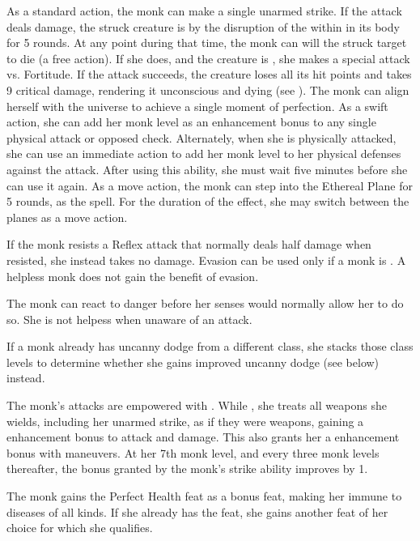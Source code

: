  As a standard action, the monk can make a single unarmed strike. If the attack deals damage, the struck creature is \sickened by the disruption of the \ki within in its body for 5 rounds. At any point during that time, the monk can will the struck target to die (a free action). If she does, and the creature is \bloodied, she makes a special attack vs. Fortitude. If the attack succeeds, the creature loses all its hit points and takes 9 critical damage, rendering it unconscious and dying (see ).
 The monk can align herself with the universe to achieve a single moment of perfection. As a swift action, she can add her monk level as an enhancement bonus to any single physical attack or opposed check. Alternately, when she is physically attacked, she can use an immediate action to add her monk level to her physical defenses against the attack. After using this ability, she must wait five minutes before she can use it again.
 As a move action, the monk can step into the Ethereal Plane for 5 rounds, as the  spell. For the duration of the effect, she may switch between the planes as a move action.

 If the monk resists a Reflex attack that normally deals half damage when resisted, she instead takes no damage. Evasion can be used only if a monk is \unencumbered. A helpless monk does not gain the benefit of evasion.

 The monk can react to danger before her senses would normally allow her to do so. She is not helpess when unaware of an attack.

If a monk already has uncanny dodge from a different class, she stacks those class levels to determine whether she gains improved uncanny dodge (see below) instead.

 The monk's attacks are empowered with \ki. While \monkunencumbered, she treats all weapons she wields, including her unarmed strike, as if they were  weapons, gaining a  enhancement bonus to attack and damage. This also grants her a  enhancement bonus with maneuvers. At her 7th monk level, and every three monk levels thereafter, the bonus granted by the monk's \ki strike ability improves by 1. 

 The monk gains the Perfect Health feat as a bonus feat, making her immune to diseases of all kinds. If she already has the feat, she gains another feat of her choice for which she qualifies.

